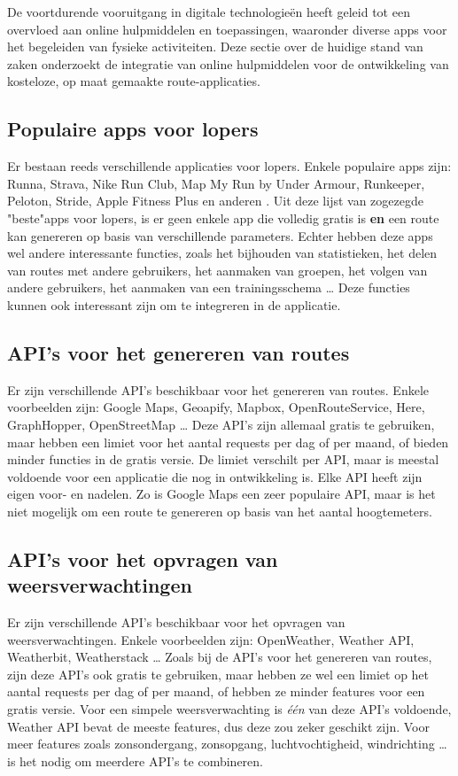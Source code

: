 De voortdurende vooruitgang in digitale technologieën heeft geleid tot een overvloed aan online hulpmiddelen en toepassingen,
waaronder diverse apps voor het begeleiden van fysieke activiteiten.
Deze sectie over de huidige stand van zaken onderzoekt de integratie van online hulpmiddelen voor de ontwikkeling van kosteloze,
op maat gemaakte route-applicaties.

\subsection{Populaire apps voor lopers}
Er bestaan reeds verschillende applicaties voor lopers. Enkele populaire apps zijn:
Runna, Strava, Nike Run Club, Map My Run by Under Armour, Runkeeper, Peloton, Stride, Apple Fitness Plus en anderen \autocite{Downey2023}.
Uit deze lijst van zogezegde "beste"\@ apps voor lopers,
is er geen enkele app die volledig gratis is \textbf{en} een route kan genereren op basis van verschillende parameters.
Echter hebben deze apps wel andere interessante functies, zoals het bijhouden van statistieken, het delen van routes met andere gebruikers,
het aanmaken van groepen, het volgen van andere gebruikers, het aanmaken van een trainingsschema \ldots \@
Deze functies kunnen ook interessant zijn om te integreren in de applicatie.

\subsection{API's voor het genereren van routes}
Er zijn verschillende API's beschikbaar voor het genereren van routes.
Enkele voorbeelden zijn: Google Maps, Geoapify, Mapbox, OpenRouteService, Here, GraphHopper, OpenStreetMap \ldots \@
Deze API's zijn allemaal gratis te gebruiken, maar hebben een limiet voor het aantal requests per dag of per maand,
of bieden minder functies in de gratis versie. De limiet verschilt per API, maar is meestal voldoende voor een applicatie die nog in ontwikkeling is.
Elke API heeft zijn eigen voor- en nadelen. Zo is Google Maps een zeer populaire API,
maar is het niet mogelijk om een route te genereren op basis van het aantal hoogtemeters.

\subsection{API's voor het opvragen van weersverwachtingen}
Er zijn verschillende API's beschikbaar voor het opvragen van weersverwachtingen.
Enkele voorbeelden zijn: OpenWeather, Weather API, Weatherbit, Weatherstack \ldots \@
Zoals bij de API's voor het genereren van routes, zijn deze API's ook gratis te gebruiken,
maar hebben ze wel een limiet op het aantal requests per dag of per maand, of hebben ze minder features voor een gratis versie.
Voor een simpele weersverwachting is \emph{één} van deze API's voldoende, Weather API bevat de meeste features,
dus deze zou zeker geschikt zijn. Voor meer features zoals zonsondergang, zonsopgang, luchtvochtigheid, windrichting \ldots \@
is het nodig om meerdere API's te combineren.

